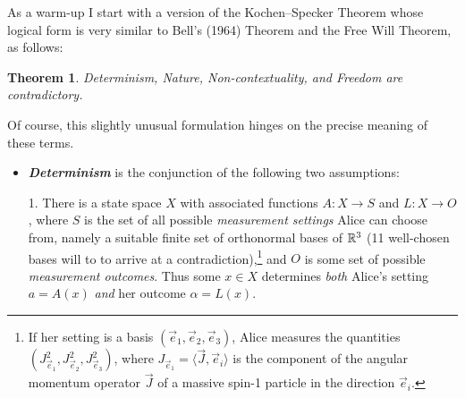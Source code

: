 \documentclass[12pt]{article}
\numberwithin{equation}{section}
\newcommand{\hi}[1]{\emph{\textbf{#1}}}
\newcommand{\raw}{\rightarrow}
\newcommand{\la}{\langle} \newcommand{\ra}{\rangle}
\newcommand{\al}{\alpha} \newcommand{\bt}{L\beta}
\newtheorem{theorem}[definition]{Theorem}
\begin{document}
As a warm-up I start with a version of the Kochen--Specker Theorem whose logical form is very similar to Bell's (1964) Theorem and the Free Will Theorem, as follows:
    \begin{theorem}\label{KSthm}
 Determinism, Nature, Non-contextuality, and Freedom  are contradictory.
\end{theorem}
Of course, this slightly unusual formulation hinges on the precise meaning of these terms. 
\begin{itemize}
\item 
{}\hi{Determinism} is the conjunction of the following two assumptions:

1. There is a state space $X$  with associated functions $A: X\raw S$ and $L:X\raw O$,
where $S$ is  the set of all  possible \emph{measurement settings} Alice can choose from, namely 
 a suitable finite set of orthonormal bases of ${\mathbb R}^3$ (11 well-chosen bases will to to arrive at a contradiction),\footnote{If her setting is a basis 
 $(\vec{e}_1,\vec{e}_2,\vec{e}_3)$, Alice measures the quantities $(J_{\vec{e}_1}^2, J_{\vec{e}_2}^2, J_{\vec{e}_3}^2)$, where
 $J_{\vec{e}_1}=\la\vec{J},\vec{e}_i\ra$ is the component of the angular momentum operator $\vec{J}$ of a massive spin-1 particle in the direction $\vec{e}_i$.} and  $O$ is some set of possible  \emph{measurement outcomes}. Thus some $x\in X$ determines \emph{both} Alice's setting $a=A(x)$ \emph{and} her 
 outcome  $\al=L(x)$. 


\end{itemize}
\end{document}
